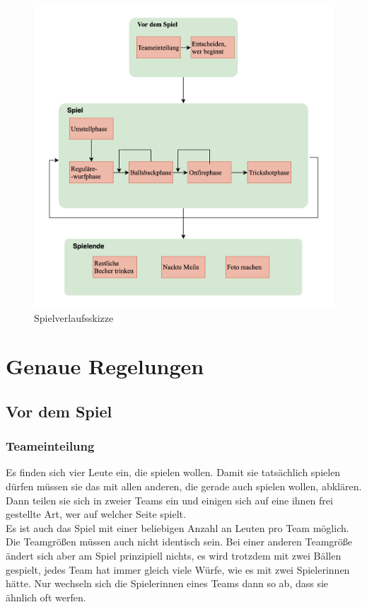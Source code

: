 \documentclass[a5paper, 12pt]{book}
\begin{document}
\begin{figure} 
    \centering
    \hspace*{-1.5cm}\includegraphics[scale = 0.27]{Bierpongflowneu.png}
    \caption{Spielverlaufsskizze}
    \label{fig:bierpongflow}
\end{figure}

\section{Genaue Regelungen}
\subsection{Vor dem Spiel}
\subsubsection{Teameinteilung}\label{teameinteilung}
Es finden sich vier Leute ein, die spielen wollen. Damit sie tatsächlich spielen dürfen müssen sie das mit allen anderen, die gerade auch spielen wollen, abklären. Dann teilen sie sich in zweier Teams ein und einigen sich auf eine ihnen frei gestellte Art, wer auf welcher Seite spielt. \\
Es ist auch das Spiel mit einer beliebigen Anzahl an Leuten pro Team möglich. Die Teamgrößen müssen auch nicht identisch sein. Bei einer anderen Teamgröße ändert sich aber am Spiel prinzipiell nichts, es wird trotzdem mit zwei Bällen gespielt, jedes Team hat immer gleich viele Würfe, wie es mit zwei Spielerinnen hätte. Nur wechseln sich die Spielerinnen eines Teams dann so ab, dass sie ähnlich oft werfen.
\end{document}
